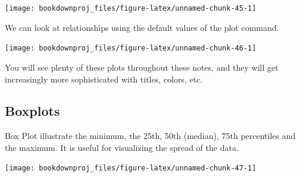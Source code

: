 \documentclass[
]{book}
\newenvironment{Shaded}{\begin{snugshade}}{\end{snugshade}}
\newcommand{\AttributeTok}[1]{\textcolor[rgb]{0.13,0.29,0.53}{#1}}
\newcommand{\DecValTok}[1]{\textcolor[rgb]{0.00,0.00,0.81}{#1}}
\newcommand{\FunctionTok}[1]{\textcolor[rgb]{0.13,0.29,0.53}{\textbf{#1}}}
\newcommand{\NormalTok}[1]{#1}
\newcommand{\SpecialCharTok}[1]{\textcolor[rgb]{0.81,0.36,0.00}{\textbf{#1}}}
\newcommand{\StringTok}[1]{\textcolor[rgb]{0.31,0.60,0.02}{#1}}
\begin{document}
\begin{Shaded}
\end{Shaded}

\begin{center}\texttt{[image: bookdownproj\_files/figure-latex/unnamed-chunk-45-1]} \end{center}

We can look at relationships using the default values of the plot command.

\begin{Shaded}
\end{Shaded}

\begin{center}\texttt{[image: bookdownproj\_files/figure-latex/unnamed-chunk-46-1]} \end{center}

You will see plenty of these plots throughout these notes, and they will get increasingly more sophisticated with titles, colors, etc.

\subsection{Boxplots}\label{boxplots}

Box Plot illustrate the minimum, the 25th, 50th (median), 75th percentiles and the maximum. It is useful for visualizing the spread of the data.

\begin{Shaded}
\end{Shaded}

\begin{center}\texttt{[image: bookdownproj\_files/figure-latex/unnamed-chunk-47-1]} \end{center}
\end{document}
